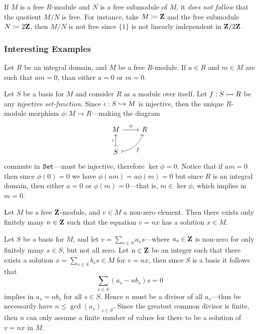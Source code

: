 \begin{remark}
    \label{rem:M/N-not-free}
    If \(M\) is a free \(R\)-module and \(N\) is a free submodule of \(M\), it
    \emph{does not follow} that the quotient \(M/N\) is free. For instance, take \(M
    \coloneq \mathbf{Z}\) and the free submodule \(N \coloneq 2 \mathbf{Z}\), then \(M/N\) is not
    free since \(\{1\}\) is not linearly independent in \(\mathbf{Z}/2\mathbf{Z}\).
\end{remark}

\subsubsection{Interesting Examples}

\begin{example}
    \label{exp:free-module-over-integral-domain}
    Let \(R\) be an integral domain, and \(M\) be a free \(R\)-module. If
    \(a \in R\) and \(m \in M\) are such that \(a m = 0\), than either \(a = 0\) or
    \(m = 0\).

    Let \(S\) be a basis for \(M\) and consider \(R\) as a module over itself. Let
    \(f: S \rightarrowtail R\) be any injective \emph{set-function}. Since \(\iota: S \hookrightarrow M\)
    is injective, then the unique \(R\)-module morphism \(\phi: M \to R\)---making
    the diagram
    \[
        \begin{tikzcd}
            M \ar[r, "\phi"] &R \\
            S \ar[u, tail, "\iota"] \ar[ru, bend right, tail, "f"']
        \end{tikzcd}
    \]
    commute in \({\texttt{Set}}\)---must be injective, therefore \(\ker \phi = 0\). Notice
    that if \(a m = 0\) then since \(\phi(0) = 0\) we have
    \(\phi(a m) = a \phi(m) = 0\) but since \(R\) is an integral domain, then either
    \(a = 0\) or \(\phi(m) = 0\)---that is, \(m \in \ker \phi\), which implies in
    \(m = 0\).
\end{example}

\begin{example}
    \label{exp:finite-solution-v-equal-nx}
    Let \(M\) be a free \(\mathbf{Z}\)-module, and \(v \in M\) a non-zero element. Then
    there exists only finitely many \(n \in \mathbf{Z}\) such that the equation \(v = n x\)
    has a solution \(x \in M\).

    Let \(S\) be a basis for \(M\), and let \(v = \sum_{s \in S} a_s s\)---where
    \(a_s \in \mathbf{Z}\) is non-zero for only finitely many \(s \in S\), but not all
    zero. Let \(n \in \mathbf{Z}\) be an integer such that there exists a solution
    \(x = \sum_{s \in S} b_s s \in M\) for \(v = n x\), then since \(S\) is a basis
    it follows that
    \[
        \sum_{s \in S}(a_s - n b_s) s = 0
    \]
    implies in \(a_s = n b_s\) for all \(s \in S\). Hence \(n\) must be a divisor of
    all \(a_s\)---thus be necessarily have \(n \leq \gcd(a_s)_{s \in S}\). Since the
    greatest common divisor is finite, then \(n\) can only assume a finite number of
    values for there to be a solution of \(v = n x\) in \(M\).
\end{example}

